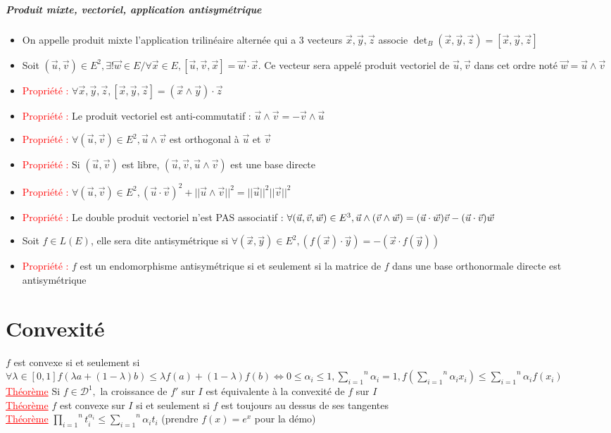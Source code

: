 \documentclass[a4paper, french]{article}
\newcommand{\p}{\wedge}
\newcommand{\D}{\mathcal{D}}
\newcommand{\al}{\alpha}
\newcommand{\la}{\lambda}
\newcommand{\som}[2]{\overset{#2}{\underset{#1}{\sum}}}
\newcommand{\produit}[2]{\overset{#2}{\underset{#1}{\prod}}}
\newcommand{\thm}{\textcolor{red}{\underline{Théorème} }}
\newcommand{\ppt}{\textcolor{red}{Propriété : }}
\begin{document}
	 \subparagraph{Produit mixte, vectoriel, application antisymétrique}
	 \begin{itemize}
		  \item On appelle produit mixte l'application trilinéaire alternée qui a 3 vecteurs $\vec{x}, \vec{y}, \vec{z}$ associe $\det_B(\vec{x},\vec{y},\vec{z})=[\vec{x},\vec{y},\vec{z}]$
		  \item Soit $(\vec{u},\vec{v}) \in E^2, \exists! \vec{w} \in E / \forall \vec{x} \in E, [\vec{u},\vec{v},\vec{x}]=\vec{w}\cdot\vec{x}.$ Ce vecteur sera appelé produit vectoriel de $\vec{u},\vec{v}$ dans cet ordre noté $\vec{w}=\vec{u}\p\vec{v}$
		 \item \ppt $\forall \vec{x},\vec{y},\vec{z}, [\vec{x},\vec{y},\vec{z}]=(\vec{x}\p\vec{y})\cdot\vec{z}$
		 \item \ppt Le produit vectoriel est anti-commutatif : $\vec{u}\p\vec{v}=-\vec{v}\p\vec{u}$
		 \item \ppt $\forall (\vec{u},\vec{v}) \in E^2, \vec{u}\p\vec{v}$ est orthogonal à $\vec{u}$ et $\vec{v}$
		 \item \ppt Si $(\vec{u},\vec{v})$ est libre, $(\vec{u},\vec{v},\vec{u}\p\vec{v})$ est une base directe
		 \item \ppt $\forall (\vec{u},\vec{v}) \in E^2, (\vec{u}\cdot\vec{v})^2+||\vec{u}\p\vec{v}||^2=||\vec{u}||^2||\vec{v}||^2$
		 \item \ppt Le double produit vectoriel n'est PAS associatif : $\forall (\vec{u},\vec{v},\vec{w}) \in E^3,\\ {\vec{u}\p (\vec{v} \p \vec{w})=(\vec{u} \cdot \vec{w})\vec{v}-(\vec{u} \cdot \vec{v})\vec{w}}$
		 \item Soit $f \in L(E)$, elle sera dite antisymétrique si $\forall (\vec{x},\vec{y}) \in E^2, (f(\vec{x})\cdot\vec{y})=-(\vec{x}\cdot f(\vec{y}))$
		 \item \ppt $f$ est un endomorphisme antisymétrique si et seulement si la matrice de $f$ dans une base orthonormale directe est antisymétrique
	 \end{itemize}


	 \section{Convexité}
	  $f$ est convexe si et seulement si $\forall \la \in [0,1] f(\la a+(1-\la)b) \leqslant \la f(a)+(1-\la)f(b) \iff 0 \leqslant \al_i \leqslant 1, \som{i=1}{n}\al_i=1, f(\som{i=1}{n}\al_i x_i) \leqslant \som{i=1}{n}\al_i f(x_i)$ \\
	  \thm Si $f \in \D^1,$ la croissance de $f'$ sur $I$ est équivalente à la convexité de $f$ sur $I$ \\
	  \thm $f$ est convexe sur $I$ si et seulement si $f$ est toujours au dessus de ses tangentes \\
	  \thm $\produit{i=1}{n}t_i^{\al_i} \leqslant \som{i=1}{n}\al_it_i$ (prendre $f(x)=e^x$ pour la démo)
	 
\end{document}
